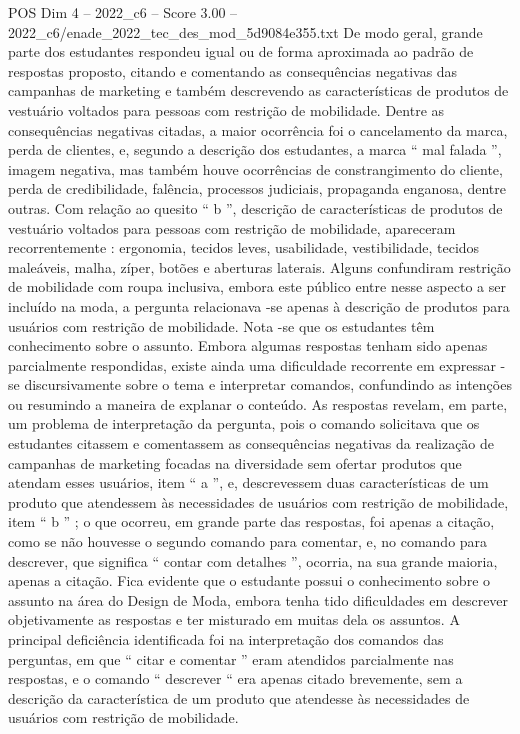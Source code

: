 \begin{textsample}{POS Dim 4 – 2022\_c6 – Score 3.00 – 2022\_c6/enade\_2022\_tec\_des\_mod\_5d9084e355.txt}
De modo geral, grande parte dos estudantes respondeu igual ou de forma aproximada ao padrão de respostas proposto, citando e comentando as consequências negativas das campanhas de marketing e também descrevendo as características de produtos de vestuário voltados para pessoas com restrição de mobilidade.
Dentre as consequências negativas citadas, a maior ocorrência foi o cancelamento da marca, perda de clientes, e, segundo a descrição dos estudantes, a marca “ mal falada ”, imagem negativa, mas também houve ocorrências de constrangimento do cliente, perda de credibilidade, falência, processos judiciais, propaganda enganosa, dentre outras.
Com relação ao quesito “ b ”, descrição de características de produtos de vestuário voltados para pessoas com restrição de mobilidade, apareceram recorrentemente : ergonomia, tecidos leves, usabilidade, vestibilidade, tecidos maleáveis, malha, zíper, botões e aberturas laterais.
Alguns confundiram restrição de mobilidade com roupa inclusiva, embora este público entre nesse aspecto a ser incluído na moda, a pergunta relacionava -se apenas à descrição de produtos para usuários com restrição de mobilidade.
Nota -se que os estudantes têm conhecimento sobre o assunto.
Embora algumas respostas tenham sido apenas parcialmente respondidas, existe ainda uma dificuldade recorrente em expressar -se discursivamente sobre o tema e interpretar comandos, confundindo as intenções ou resumindo a maneira de explanar o conteúdo.
As respostas revelam, em parte, um problema de interpretação da pergunta, pois o comando solicitava que os estudantes citassem e comentassem as consequências negativas da realização de campanhas de marketing focadas na diversidade sem ofertar produtos que atendam esses usuários, item “ a ”, e, descrevessem duas características de um produto que atendessem às necessidades de usuários com restrição de mobilidade, item “ b ” ; o que ocorreu, em grande parte das respostas, foi apenas a citação, como se não houvesse o segundo comando para comentar, e, no comando para descrever, que significa “ contar com detalhes ”, ocorria, na sua grande maioria, apenas a citação.
Fica evidente que o estudante possui o conhecimento sobre o assunto na área do Design de Moda, embora tenha tido dificuldades em descrever objetivamente as respostas e ter misturado em muitas dela os assuntos.
A principal deficiência identificada foi na interpretação dos comandos das perguntas, em que “ citar e comentar ” eram atendidos parcialmente nas respostas, e o comando “ descrever “ era apenas citado brevemente, sem a descrição da característica de um produto que atendesse às necessidades de usuários com restrição de mobilidade.

\end{textsample}
